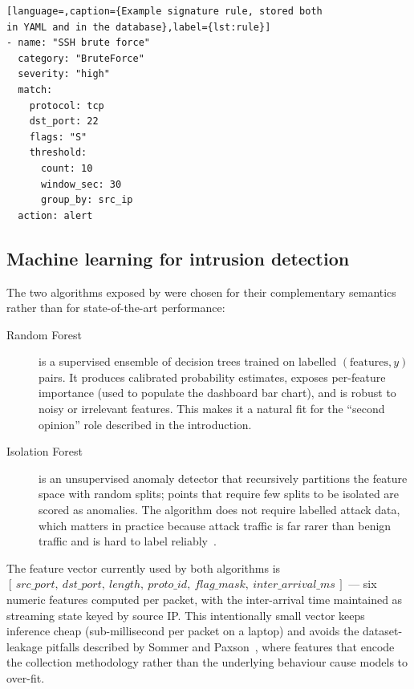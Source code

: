 \begin{lstlisting}[language=,caption={Example signature rule, stored both
in YAML and in the database},label={lst:rule}]
- name: "SSH brute force"
  category: "BruteForce"
  severity: "high"
  match:
    protocol: tcp
    dst_port: 22
    flags: "S"
    threshold:
      count: 10
      window_sec: 30
      group_by: src_ip
  action: alert
\end{lstlisting}

\subsection{Machine learning for intrusion detection}

The two algorithms exposed by \nidsname{} were chosen for their
complementary semantics rather than for state-of-the-art performance:
\begin{description}
    \item[Random Forest~\cite{breiman2001random}] is a supervised
        ensemble of decision trees trained on labelled
        $(\text{features}, y)$ pairs. It produces calibrated probability
        estimates, exposes per-feature importance (used to populate the
        dashboard bar chart), and is robust to noisy or irrelevant
        features. This makes it a natural fit for the ``second opinion''
        role described in the introduction.
    \item[Isolation Forest~\cite{liu2008isolation}] is an unsupervised
        anomaly detector that recursively partitions the feature space
        with random splits; points that require few splits to be
        isolated are scored as anomalies. The algorithm does not require
        labelled attack data, which matters in practice because attack
        traffic is far rarer than benign traffic and is hard to label
        reliably~\cite{sommer2010outside}.
\end{description}

The feature vector currently used by both algorithms is
$[\,src\_port,\ dst\_port,\ length,\ proto\_id,\ flag\_mask,\ inter\_arrival\_ms\,]$
--- six numeric features computed per packet, with the inter-arrival
time maintained as streaming state keyed by source IP. This intentionally
small vector keeps inference cheap (sub-millisecond per packet on a
laptop) and avoids the dataset-leakage pitfalls described by Sommer and
Paxson~\cite{sommer2010outside}, where features that encode the
collection methodology rather than the underlying behaviour cause models
to over-fit.

